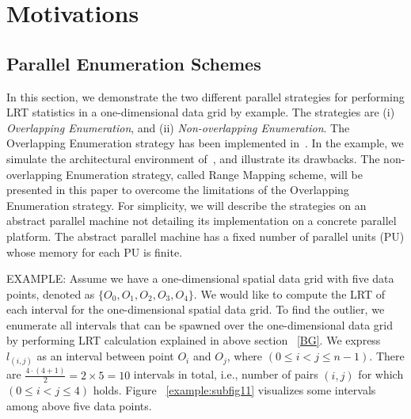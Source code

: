 \documentclass[AMA,LATO1COL]{WileyNJD-v2}
\begin{document}
\section{Motivations}
\label{sec:mov}

\subsection{Parallel Enumeration Schemes}
\label{sec:mov1}

In this section, we demonstrate the two different parallel strategies for performing LRT statistics in a one-dimensional data grid by example. The strategies are (i) \emph{Overlapping Enumeration}, and (ii) \emph{Non-overlapping Enumeration}. The Overlapping Enumeration strategy has been implemented in~\cite{apweb}. In the example, we simulate the architectural environment of~\cite{apweb}, and illustrate its drawbacks. The non-overlapping Enumeration strategy, called Range Mapping scheme, will be presented in this paper to overcome the limitations of the Overlapping Enumeration strategy. For simplicity, we will describe the strategies on an abstract parallel machine not detailing its implementation on a concrete parallel platform.  The abstract parallel machine has a fixed number of parallel units (PU) whose memory for each PU is finite.

EXAMPLE: Assume we have a one-dimensional spatial data grid with  five data points, denoted as $\{O_0,O_1,O_2,O_3,O_4\}$. We would like to compute the LRT of each interval for the one-dimensional spatial data grid. To find the outlier, we enumerate all intervals that can be spawned over the one-dimensional data grid by performing LRT calculation explained in above section ~\ref{BG}. We express $l_{(i,j)}$ as an interval between point $O_i$ and $O_j$, where $ (0 \leq i <j \leq n-1)$.  There are ${\frac{4 \cdot (4+1)}{2}}=2\times 5=10$ intervals in total, i.e., number of pairs $(i,j)$ for which $(0 \leq i < j \leq 4)$ holds. Figure ~\ref{example:subfig11} visualizes some intervals among above five data points. 
\end{document}
